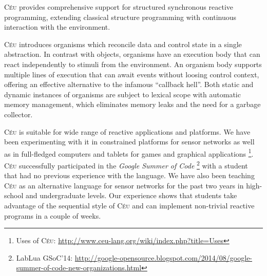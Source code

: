 \documentclass{sigplanconf}
\newcommand{\CEU}{\textsc{C\'{e}u}\xspace}
\newcommand{\1}{\;}
\newcommand{\2}{\;\;}
\newcommand{\3}{\;\;\;}
\newcommand{\5}{\;\;\;\;\;}
\newcommand{\URL}{\small\url}
\begin{document}
\CEU provides comprehensive support for structured synchronous reactive 
programming, extending classical structure programming with continuous 
interaction with the environment.

\CEU introduces organisms which reconcile data and control state in a single 
abstraction.
%
In contrast with objects, organisms have an execution body that can react 
independently to stimuli from the environment.
An organism body supports multiple lines of execution that can await events 
without loosing control context, offering an effective alternative to the 
infamous ``callback hell''.
%
Both static and dynamic instances of organisms are subject to lexical scope 
with automatic memory management, which eliminates memory leaks and the need 
for a garbage collector.

\CEU is suitable for wide range of reactive applications and platforms.
%
We have been experimenting with it in constrained platforms for sensor networks 
as well as in full-fledged computers and tablets for games and graphical 
applications%
\footnote{Uses of \CEU: \URL{http://www.ceu-lang.org/wiki/index.php?title=Uses}}.
%
\CEU successfully participated in the \emph{Google Summer of Code}%
\footnote{LabLua GSoC'14: 
\small{\URL{http://google-opensource.blogspot.com/2014/08/google-summer-of-code-new-organizations.html}}}
with a student that had no previous experience with the language.
%
We have also been teaching \CEU as an alternative language for sensor networks 
for the past two years in high-school and undergraduate levels.
%
Our experience shows that students take advantage of the sequential style of 
\CEU and can implement non-trivial reactive programs in a couple of weeks.




\end{document}
